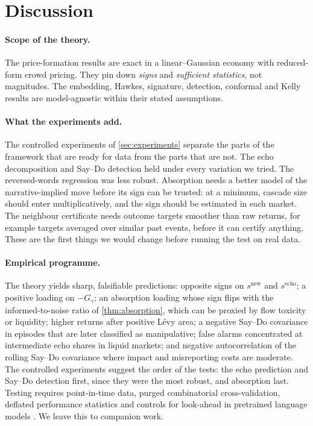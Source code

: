 \documentclass[11pt,a4paper]{article}
\theoremstyle{plain}
\theoremstyle{definition}
\theoremstyle{remark}
\begin{document}
\section{Discussion}\label{sec:discussion}

\paragraph{Scope of the theory.} The price-formation results are exact in a linear--Gaussian economy with reduced-form crowd pricing. They pin down \emph{signs} and \emph{sufficient statistics}, not magnitudes. The embedding, Hawkes, signature, detection, conformal and Kelly results are model-agnostic within their stated assumptions.

\paragraph{What the experiments add.} The controlled experiments of \cref{sec:experiments} separate the parts of the framework that are ready for data from the parts that are not. The echo decomposition and Say--Do detection held under every variation we tried. The reversed-words regression was less robust. Absorption needs a better model of the narrative-implied move before its sign can be trusted: at a minimum, cascade size should enter multiplicatively, and the sign should be estimated in each market. The neighbour certificate needs outcome targets smoother than raw returns, for example targets averaged over similar past events, before it can certify anything. These are the first things we would change before running the test on real data.

\paragraph{Empirical programme.} The theory yields sharp, falsifiable predictions: opposite signs on $s^{\text{new}}$ and $s^{\text{echo}}$; a positive loading on $-G_\gamma$; an absorption loading whose sign flips with the informed-to-noise ratio of \cref{thm:absorption}, which can be proxied by flow toxicity or liquidity; higher returns after positive L\'evy area; a negative Say--Do covariance in episodes that are later classified as manipulative; false alarms concentrated at intermediate echo shares in liquid markets; and negative autocorrelation of the rolling Say--Do covariance where impact and misreporting costs are moderate. The controlled experiments suggest the order of the tests: the echo prediction and Say--Do detection first, since they were the most robust, and absorption last. Testing requires point-in-time data, purged combinatorial cross-validation, deflated performance statistics and controls for look-ahead in pretrained language models \citep{lopezdeprado2018,bailey2014dsr,glasserman2023}. We leave this to companion work.
\end{document}
